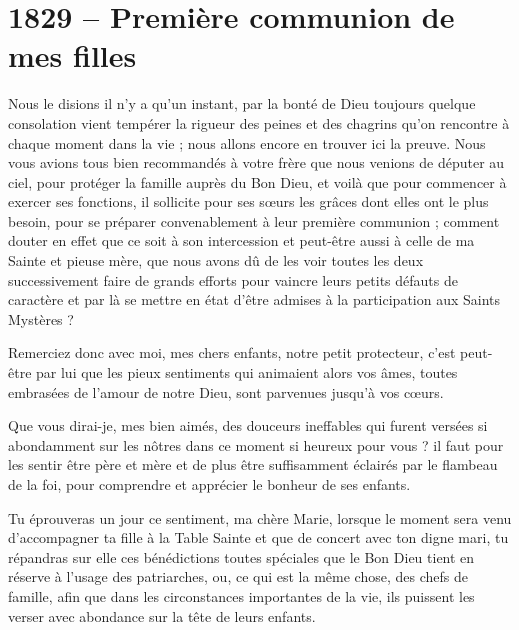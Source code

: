 \documentclass[11pt,a4paper]{report}
\begin{document}
\section*{1829 -- Première communion de mes filles}

Nous le disions il n'y a qu'un instant, par la bonté de Dieu toujours quelque consolation vient tempérer la rigueur des peines et des chagrins qu'on rencontre à chaque moment dans la vie ; nous allons encore en trouver ici la preuve. Nous vous avions tous bien recommandés à votre frère que nous venions de députer au ciel, pour protéger la famille auprès du Bon Dieu, et voilà que pour commencer à exercer ses fonctions, il sollicite pour ses sœurs les grâces dont elles ont le plus besoin, pour se préparer convenablement à leur première communion ; comment douter en effet que ce soit à son intercession et peut-être aussi à celle de ma Sainte et pieuse mère, que nous avons dû de les voir toutes les deux successivement faire de grands efforts pour vaincre leurs petits défauts de caractère et par là se mettre en état d'être admises à la participation aux Saints Mystères ?

Remerciez donc avec moi, mes chers enfants, notre petit protecteur, c'est peut-être par lui que les pieux sentiments qui animaient alors vos âmes, toutes embrasées de l'amour de notre Dieu, sont parvenues jusqu'à vos cœurs.

Que vous dirai-je, mes bien aimés, des douceurs ineffables qui furent versées si abondamment sur les nôtres dans ce moment si heureux pour vous ? il faut pour les sentir être père et mère et de plus être suffisamment éclairés par le flambeau de la foi, pour comprendre et apprécier le bonheur de ses enfants.

Tu éprouveras un jour ce sentiment, ma chère Marie, lorsque le moment sera venu d'accompagner ta fille à la Table Sainte et que de concert avec ton digne mari, tu répandras sur elle ces bénédictions toutes spéciales que le Bon Dieu tient en réserve à l'usage des patriarches, ou, ce qui est la même chose, des chefs de famille, afin que dans les circonstances importantes de la vie, ils puissent les verser avec abondance sur la tête de leurs enfants.
\end{document}
